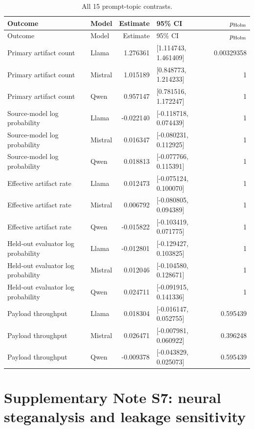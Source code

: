 \documentclass[fleqn,10pt]{wlscirep}
\begin{document}
\begin{longtable}{L{0.34\textwidth}L{0.13\textwidth}r L{0.22\textwidth}r}
\caption{\label{tab:all-topic}All 15 prompt-topic contrasts.}\\
\toprule
Outcome & Model & Estimate & 95\% CI & \(p_{\rm Holm}\) \\
\midrule
\endfirsthead
\toprule
Outcome & Model & Estimate & 95\% CI & \(p_{\rm Holm}\) \\
\midrule
\endhead
Primary artifact count & Llama & 1.276361 & [1.114743, 1.461409] & 0.00329358 \\
Primary artifact count & Mistral & 1.015189 & [0.848773, 1.214233] & 1 \\
Primary artifact count & Qwen & 0.957147 & [0.781516, 1.172247] & 1 \\
Source-model log probability & Llama & -0.022140 & [-0.118718, 0.074439] & 1 \\
Source-model log probability & Mistral & 0.016347 & [-0.080231, 0.112925] & 1 \\
Source-model log probability & Qwen & 0.018813 & [-0.077766, 0.115391] & 1 \\
Effective artifact rate & Llama & 0.012473 & [-0.075124, 0.100070] & 1 \\
Effective artifact rate & Mistral & 0.006792 & [-0.080805, 0.094389] & 1 \\
Effective artifact rate & Qwen & -0.015822 & [-0.103419, 0.071775] & 1 \\
Held-out evaluator log probability & Llama & -0.012801 & [-0.129427, 0.103825] & 1 \\
Held-out evaluator log probability & Mistral & 0.012046 & [-0.104580, 0.128671] & 1 \\
Held-out evaluator log probability & Qwen & 0.024711 & [-0.091915, 0.141336] & 1 \\
Payload throughput & Llama & 0.018304 & [-0.016147, 0.052755] & 0.595439 \\
Payload throughput & Mistral & 0.026471 & [-0.007981, 0.060922] & 0.396248 \\
Payload throughput & Qwen & -0.009378 & [-0.043829, 0.025073] & 0.595439 \\
\bottomrule
\end{longtable}

\section*{Supplementary Note S7: neural steganalysis and leakage sensitivity}\label{si:s7}
\end{document}
